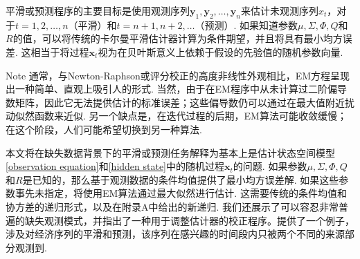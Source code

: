\documentclass[UTF8,12pt]{ctexart}
\numberwithin{equation}{section}%
\begin{document}
	平滑或预测程序的主要目标是使用观测序列$\boldsymbol{y}_1, \boldsymbol{y}_2, \ldots, \boldsymbol{y}_n$来估计未观测序列$x_t$，对于$t=1,2, \ldots, n$（平滑）和$t=n+1, n+2, \ldots$（预测）. 如果知道参数$\mu, \Sigma, \Phi, Q$和$R$的值，可以将传统的卡尔曼平滑估计器计算为条件期望，并且将具有{\color{brown}最小均方误差}. 这相当于将过程$\boldsymbol{x}_t$视为在贝叶斯意义上依赖于假设的先验值的随机参数向量. 
	
	
	\begin{ascolorbox3}{Note}
		通常，与Newton-Raphson或评分校正的高度非线性外观相比，EM方程呈现出一种简单、直观上吸引人的形式. 当然，由于在EM程序中从未计算过二阶偏导数矩阵，因此它无法提供估计的标准误差；这些偏导数仍可以通过在最大值附近扰动似然函数来近似. 另一个缺点是，在迭代过程的后期，EM算法可能收敛缓慢；在这个阶段，人们可能希望切换到另一种算法.
	\end{ascolorbox3}
	本文将在缺失数据背景下的平滑或预测任务解释为基本上是估计状态空间模型\eqref{observation equation}和\eqref{hidden state}中的随机过程$\boldsymbol{x}_t$的问题. 如果参数$\mu, \Sigma, \Phi, Q$和$R$是已知的，那么基于观测数据的条件均值提供了最小均方误差解. 如果这些参数事先未指定，将使用EM算法通过最大似然进行估计. 这需要传统的条件均值和协方差的递归形式，以及在附录A中给出的新递归. 我们还展示了可以容忍非常普遍的缺失观测模式，并指出了一种用于调整估计器的校正程序。提供了一个例子，涉及对经济序列的平滑和预测，该序列在感兴趣的时间段内只被两个不同的来源部分观测到.
	
	
\end{document}
